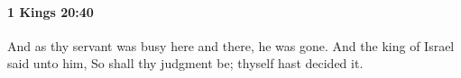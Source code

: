 
		\paragraph{1 Kings 20:40} %
			\label{1KINGS-20-40}

			And as thy servant was busy here and there, he was gone. And the king of Israel said unto him, So shall thy judgment be; thyself hast decided it.


